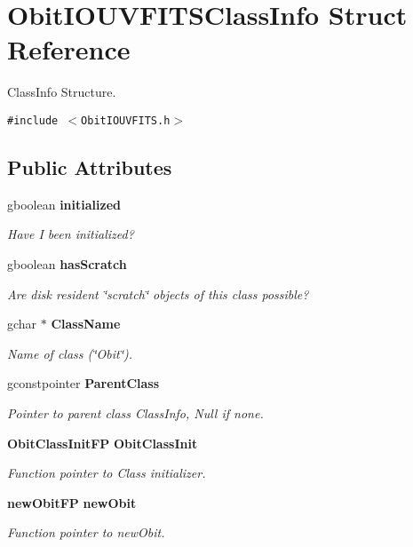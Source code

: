 \section{Obit\-IOUVFITSClass\-Info Struct Reference}
\label{structObitIOUVFITSClassInfo}
Class\-Info Structure.  


{\tt \#include $<$Obit\-IOUVFITS.h$>$}

\subsection*{Public Attributes}
\begin{CompactItemize}
\item 
gboolean {\bf initialized}
\begin{CompactList}\small\item\em Have I been initialized? \item\end{CompactList}\item 
gboolean {\bf has\-Scratch}
\begin{CompactList}\small\item\em Are disk resident \char`\"{}scratch\char`\"{} objects of this class possible? \item\end{CompactList}\item 
gchar $\ast$ {\bf Class\-Name}
\begin{CompactList}\small\item\em Name of class (\char`\"{}Obit\char`\"{}). \item\end{CompactList}\item 
gconstpointer {\bf Parent\-Class}
\begin{CompactList}\small\item\em Pointer to parent class Class\-Info, Null if none. \item\end{CompactList}\item 
{\bf Obit\-Class\-Init\-FP} {\bf Obit\-Class\-Init}
\begin{CompactList}\small\item\em Function pointer to Class initializer. \item\end{CompactList}\item 
{\bf new\-Obit\-FP} {\bf new\-Obit}
\begin{CompactList}\small\item\em Function pointer to new\-Obit. \item\end{CompactList}\item 

\end{CompactItemize}
